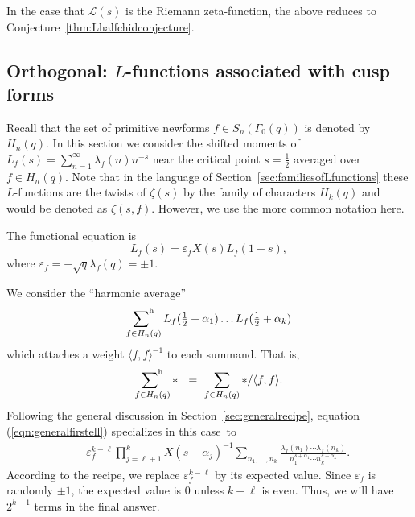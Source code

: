 \documentclass[12pt,letterpaper]{amsart}
\theoremstyle{plain}
\theoremstyle{definition}
\theoremstyle{remark}
\numberwithin{equation}{subsection}
\numberwithin{theorem}{subsection}
\numberwithin{table}{subsection}
\def\sumhar{\operatornamewithlimits{\sum\nolimits^h}}
\begin{document}
In the case that $\mathcal{L}(s)$ is the Riemann
zeta-function, the above reduces to Conjecture~\ref{thm:Lhalfchidconjecture}.



\subsection{  Orthogonal: $L$-functions associated with cusp
forms }



Recall that the set of primitive newforms $f\in S_n(\Gamma_0(q))$
is denoted by $H_n(q)$. In this section we consider the shifted
moments of $L_f(s)=\sum_{n=1}^\infty \lambda_f(n)n^{-s}$ near the
critical point $s=\frac12 $ averaged over $f\in H_n(q)$. 
Note that in the language of
Section~\ref{sec:familiesofLfunctions} these $L$-functions are the
twists of $\zeta(s)$ by the family of characters $H_k(q)$ and
would be denoted as $\zeta(s,f)$.  However, we use the more common
notation here.

The functional equation is
\begin{equation}
L_f(s)=\varepsilon_f X(s)L_f(1-s),
\end{equation}
where $\varepsilon_f=-\sqrt{q}\lambda_f(q)=\pm 1$.


We consider the ``harmonic average''
\begin{equation}
\sumhar_{f\in H_n(q)} L_f(\tfrac12 +\alpha_1)\dots L_f(\tfrac12
+\alpha_k)
\end{equation}
which attaches a weight $\langle f,f\rangle ^{-1}$ to each
summand. That is,
\begin{equation}
\sumhar_{f\in H_n(q)} * \ \ =\ \sum_{f\in H_n(q)} */\langle
f,f\rangle .
\end{equation}
Following the general discussion in
Section~\ref{sec:generalrecipe}, equation
(\ref{eqn:generalfirstell}) specializes in this case~to
\begin{eqnarray}\label{eqn:cuspsumterm}
&   & \varepsilon_f^{k-\ell} \prod_{j=\ell+1}^k X(s
-\alpha_j)^{-1} \sum_{n_1,\dots, n_k}
    \frac{\lambda_f(n_1)\cdots \lambda_f(n_k)
}{n_1^{s +\alpha_1}\cdots n_k^{s-\alpha_k}} .
 \end{eqnarray}
According to the recipe, we replace $\varepsilon_f^{k-\ell}$ by
its expected value. Since $\varepsilon_f$ is randomly $\pm1$, the
expected value is 0 unless $k-\ell$ is even.  Thus, we will have
$2^{k-1}$ terms in the final answer.
\end{document}
